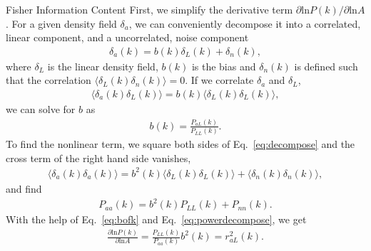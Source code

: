 \begin{section}{Fisher Information Content}
  First, we simplify the derivative term
  $\partial \mathrm{ln} P(k)/\partial\mathrm{ln} A$.  For a given density field $\delta_a$, we can
  conveniently decompose it into a correlated, linear component,
  and a uncorrelated, noise component
  \begin{align}
    \delta_a(k) = b (k) \delta _L (k) + \delta_{n}(k),
    \label{eq:decompose}
  \end{align}
  where $\delta_L$ is the linear density field, $b(k)$ is the
  bias and $\delta_{n}(k)$ is defined such that the correlation
  $\langle \delta_L(k)\delta_{n}(k) \rangle=0$.  If we correlate
  $\delta_a$ and $\delta_L$,
  \begin{align}
    \langle \delta_a(k)\delta_L(k) \rangle = b(k) \langle \delta_L(k)\delta_L(k) \rangle,
    \label{eq:correlating}
  \end{align} 
  we can solve for $b$ as
  \begin{align}
    b (k) = \frac{P _{aL}(k)}{P_{LL}(k)}.
    \label{eq:bofk}
  \end{align}
  To find the nonlinear term, we square both sides of Eq.~\ref{eq:decompose}
  and the cross term of the right hand side vanishes,
  \begin{align}
    \langle \delta_a(k) \delta_a(k) \rangle = 
    b^2(k) \langle \delta_L(k) \delta_L(k) \rangle + \langle \delta_{n}(k)\delta_{n}(k) \rangle,
  \end{align}
  and find
  \begin{align}
    P_{aa}(k) = b^2(k) P_{LL}(k) + P_{nn}(k).
    \label{eq:powerdecompose}
  \end{align}
  With the help of Eq.~\ref{eq:bofk} and Eq.~\ref{eq:powerdecompose},
  we get
  \begin{align}
    \frac{\partial \mathrm{ln} P(k) }{ \partial \mathrm{ln} A}=
    \frac{P_{LL}(k)}{P_{aa}(k)}b^2(k)=r^2_{aL}(k).
  \end{align}


\end{section}
